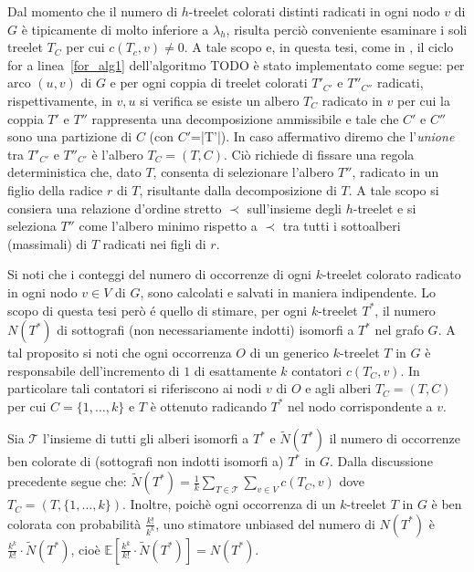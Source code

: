 Dal momento che il numero di $h$-treelet colorati distinti radicati in ogni nodo $v$ di $G$ è tipicamente di molto inferiore a $\lambda_h$, risulta perciò conveniente esaminare i soli treelet $T_C$ per cui $c(T_c, v) \neq 0$.
A tale scopo e, in questa tesi, come in \cite{bressan2019motivo}, il ciclo for a linea~\ref{for_alg1} dell'algoritmo TODO è stato implementato come segue:
per arco $(u,v)$ di $G$ e per ogni coppia di treelet colorati $T'_{C'}$ e $T''_{C''}$ radicati, rispettivamente, in $v,u$  si verifica se esiste un albero $T_C$ radicato in $v$ per cui la coppia  $ T'$ e $ T''$ rappresenta una decomposizione ammissibile e tale che $C'$ e $C''$ sono una partizione di $C$ (con $C'$=|T'|). In caso affermativo diremo che l'\emph{unione} tra $T'_{C'}$ e $T''_{C'}$ è l'albero $T_C = (T, C)$.
Ciò richiede di fissare una regola deterministica che, dato $T$, consenta di selezionare l'albero $T''$, radicato in un figlio della radice $r$ di $T$, risultante dalla decomposizione di $T$. A tale scopo si consiera una relazione d'ordine stretto $\prec$ sull'insieme degli $h$-treelet e si seleziona $T''$ come l'albero minimo rispetto a $\prec$ tra tutti i sottoalberi (massimali) di $T$ radicati nei figli di $r$.




Si noti che i conteggi del numero di occorrenze di ogni $ k $-treelet colorato radicato in ogni nodo $ v\in V $ di $ G $, sono calcolati e salvati in maniera indipendente.
Lo scopo di questa tesi per\`o \'e quello di stimare, per ogni $k$-treelet $T^*$, il numero $N(T^*)$ di  sottografi (non necessariamente indotti) isomorfi a $T^*$ nel grafo $ G $.
A tal proposito si noti che ogni occorrenza $O$ di un generico $k$-treelet $T$ in $G$ è responsabile dell'incremento di $1$ di esattamente $k$ contatori $c(T_C, v)$. In particolare tali contatori si riferiscono ai nodi $v$ di $O$ e agli alberi $T_C = (T,C)$ per cui $C = \{1, \dots, k\} $ e $T$ è ottenuto radicando $T^*$ nel nodo corrispondente a $v$.

Sia $\mathcal{T}$ l'insieme di tutti gli alberi isomorfi a $T^*$ e $\widetilde{N}(T^*)$ il numero di occorrenze ben colorate di (sottografi non indotti isomorfi a) $T^*$ in $G$. Dalla discussione precedente segue che:
$\widetilde{N}(T^*) = \frac{1}{k}\sum_{T \in \mathcal{T}} \sum_{v \in V} c( T_C, v)$ dove $T_C = (T, \{1,\dots, k\})$. 
Inoltre, poich\`e ogni occorrenza di un $k$-treelet $T$ in $G$ è ben colorata con probabilità $\frac{k!}{k^k}$, uno stimatore unbiased del numero di $N(T^*)$ è $\frac{k^k}{k!} \cdot \widetilde{N}(T^*)$, cioè
$\mathbb{E}\left[\frac{k^k}{k!} \cdot \widetilde{N}(T^*)\right] = N(T^*)$.



